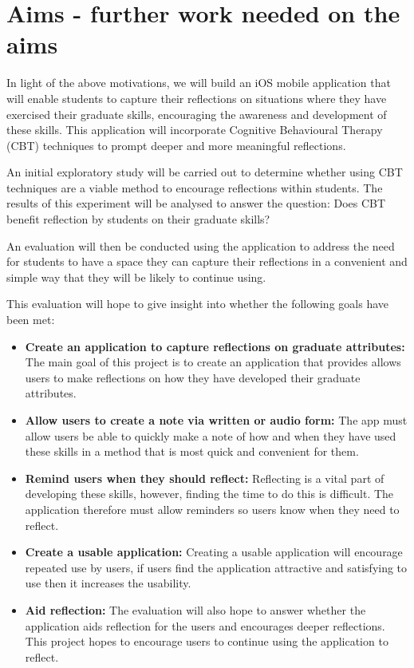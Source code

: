 \documentclass{l4proj}
\begin{document}
\section{Aims - further work needed on the aims} \label{IntroAims}
In light of the above motivations, we will build an iOS mobile application that will enable students to capture their reflections on situations where they have exercised their graduate skills, encouraging the awareness and development of these skills. This application will incorporate Cognitive Behavioural Therapy (CBT) techniques to prompt deeper and more meaningful reflections. 

An initial exploratory study will be carried out to determine whether using CBT techniques are a viable method to encourage reflections within students. The results of this experiment will be analysed to answer the question: Does CBT benefit reflection by students on their graduate skills?

An evaluation will then be conducted using the application to address the need for students to have a space they can capture their reflections in a convenient and simple way that they will be likely to continue using. 
 
This evaluation will hope to give insight into whether the following goals have been met:
\begin{itemize}
    \item \textbf{Create an application to capture reflections on graduate attributes:} The main goal of this project is to create an application that provides allows users to make reflections on how they have developed their graduate attributes.
    \item \textbf{Allow users to create a note via written or audio form:} The app must allow users be able to quickly make a note of how and when they have used these skills in a method that is most quick and convenient for them.
    \item \textbf{Remind users when they should reflect:} Reflecting is a vital part of developing these skills, however, finding the time to do this is difficult. The application therefore must allow reminders so users know when they need to reflect.
    \item \textbf{Create a usable application:} Creating a usable application will encourage repeated use by users, if users find the application attractive and satisfying to use then it increases the usability.
    \item \textbf{Aid reflection:} The evaluation will also hope to answer whether the application aids reflection for the users and encourages deeper reflections. This project hopes to encourage users to continue using the application to reflect.
\end{itemize}
\end{document}
